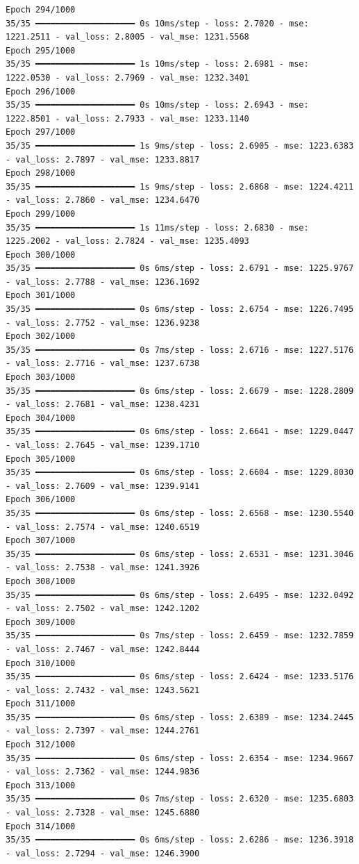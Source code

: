 \documentclass[
  letterpaper,
  DIV=11,
  numbers=noendperiod]{scrreprt}
\begin{document}
\begin{verbatim}
Epoch 294/1000
35/35 ━━━━━━━━━━━━━━━━━━━━ 0s 10ms/step - loss: 2.7020 - mse: 1221.2511 - val_loss: 2.8005 - val_mse: 1231.5568
Epoch 295/1000
35/35 ━━━━━━━━━━━━━━━━━━━━ 1s 10ms/step - loss: 2.6981 - mse: 1222.0530 - val_loss: 2.7969 - val_mse: 1232.3401
Epoch 296/1000
35/35 ━━━━━━━━━━━━━━━━━━━━ 0s 10ms/step - loss: 2.6943 - mse: 1222.8501 - val_loss: 2.7933 - val_mse: 1233.1140
Epoch 297/1000
35/35 ━━━━━━━━━━━━━━━━━━━━ 1s 9ms/step - loss: 2.6905 - mse: 1223.6383 - val_loss: 2.7897 - val_mse: 1233.8817
Epoch 298/1000
35/35 ━━━━━━━━━━━━━━━━━━━━ 1s 9ms/step - loss: 2.6868 - mse: 1224.4211 - val_loss: 2.7860 - val_mse: 1234.6470
Epoch 299/1000
35/35 ━━━━━━━━━━━━━━━━━━━━ 1s 11ms/step - loss: 2.6830 - mse: 1225.2002 - val_loss: 2.7824 - val_mse: 1235.4093
Epoch 300/1000
35/35 ━━━━━━━━━━━━━━━━━━━━ 0s 6ms/step - loss: 2.6791 - mse: 1225.9767 - val_loss: 2.7788 - val_mse: 1236.1692
Epoch 301/1000
35/35 ━━━━━━━━━━━━━━━━━━━━ 0s 6ms/step - loss: 2.6754 - mse: 1226.7495 - val_loss: 2.7752 - val_mse: 1236.9238
Epoch 302/1000
35/35 ━━━━━━━━━━━━━━━━━━━━ 0s 7ms/step - loss: 2.6716 - mse: 1227.5176 - val_loss: 2.7716 - val_mse: 1237.6738
Epoch 303/1000
35/35 ━━━━━━━━━━━━━━━━━━━━ 0s 6ms/step - loss: 2.6679 - mse: 1228.2809 - val_loss: 2.7681 - val_mse: 1238.4231
Epoch 304/1000
35/35 ━━━━━━━━━━━━━━━━━━━━ 0s 6ms/step - loss: 2.6641 - mse: 1229.0447 - val_loss: 2.7645 - val_mse: 1239.1710
Epoch 305/1000
35/35 ━━━━━━━━━━━━━━━━━━━━ 0s 6ms/step - loss: 2.6604 - mse: 1229.8030 - val_loss: 2.7609 - val_mse: 1239.9141
Epoch 306/1000
35/35 ━━━━━━━━━━━━━━━━━━━━ 0s 6ms/step - loss: 2.6568 - mse: 1230.5540 - val_loss: 2.7574 - val_mse: 1240.6519
Epoch 307/1000
35/35 ━━━━━━━━━━━━━━━━━━━━ 0s 6ms/step - loss: 2.6531 - mse: 1231.3046 - val_loss: 2.7538 - val_mse: 1241.3926
Epoch 308/1000
35/35 ━━━━━━━━━━━━━━━━━━━━ 0s 6ms/step - loss: 2.6495 - mse: 1232.0492 - val_loss: 2.7502 - val_mse: 1242.1202
Epoch 309/1000
35/35 ━━━━━━━━━━━━━━━━━━━━ 0s 7ms/step - loss: 2.6459 - mse: 1232.7859 - val_loss: 2.7467 - val_mse: 1242.8444
Epoch 310/1000
35/35 ━━━━━━━━━━━━━━━━━━━━ 0s 6ms/step - loss: 2.6424 - mse: 1233.5176 - val_loss: 2.7432 - val_mse: 1243.5621
Epoch 311/1000
35/35 ━━━━━━━━━━━━━━━━━━━━ 0s 6ms/step - loss: 2.6389 - mse: 1234.2445 - val_loss: 2.7397 - val_mse: 1244.2761
Epoch 312/1000
35/35 ━━━━━━━━━━━━━━━━━━━━ 0s 6ms/step - loss: 2.6354 - mse: 1234.9667 - val_loss: 2.7362 - val_mse: 1244.9836
Epoch 313/1000
35/35 ━━━━━━━━━━━━━━━━━━━━ 0s 7ms/step - loss: 2.6320 - mse: 1235.6803 - val_loss: 2.7328 - val_mse: 1245.6880
Epoch 314/1000
35/35 ━━━━━━━━━━━━━━━━━━━━ 0s 6ms/step - loss: 2.6286 - mse: 1236.3918 - val_loss: 2.7294 - val_mse: 1246.3900

\end{verbatim}
\end{document}
